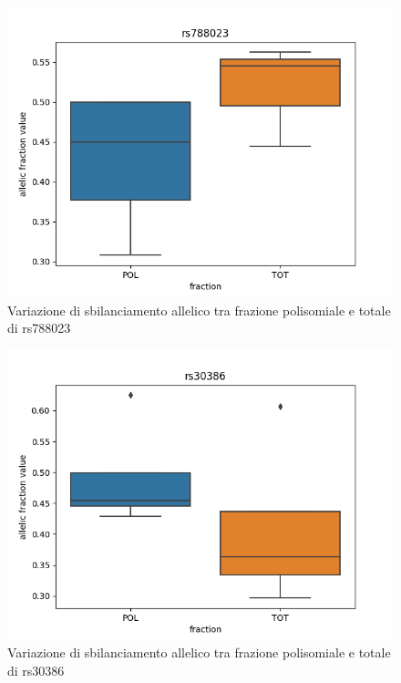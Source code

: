 \begin{multicols}{2}
\begin{figure}[H]
  \centering
  \includegraphics[scale=0.5]{scr_NUTLIN_rs788023.png}
  \caption{Variazione di sbilanciamento allelico tra frazione polisomiale e totale di rs788023}
  \label{fig:SF3B1}
\end{figure}

\begin{figure}[H]
  \centering
  \includegraphics[scale=0.5]{scr_NUTLIN_rs30386.png}
  \caption{Variazione di sbilanciamento allelico tra frazione polisomiale e totale di rs30386}
  \label{fig:TBC1D9B}
\end{figure}


\end{multicols}
